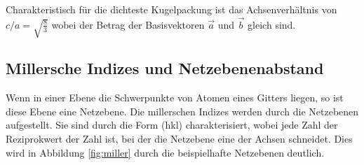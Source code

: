 Charakteristisch für die dichteste Kugelpackung ist das Achsenverhältnis von $c/a = \sqrt{\frac{8}{3}}$ wobei der Betrag der Basisvektoren $\vec{a}$ und $\vec{b}$ gleich sind.

\subsection{Millersche Indizes und Netzebenenabstand}
Wenn in einer Ebene die Schwerpunkte von Atomen eines Gitters liegen, so ist diese Ebene eine Netzebene.
Die millerschen Indizes werden durch die Netzebenen aufgestellt. 
Sie sind durch die Form (hkl) charakterisiert, wobei jede Zahl der Reziprokwert der Zahl ist, bei der die Netzebene eine der Achsen schneidet. 
Dies wird in Abbildung \ref{fig:miller} durch die beispielhafte Netzebenen deutlich.

